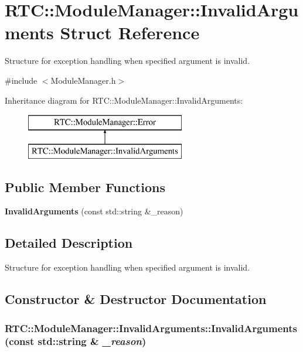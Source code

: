 \section{RTC::ModuleManager::InvalidArguments Struct Reference}
\label{structRTC_1_1ModuleManager_1_1InvalidArguments}


Structure for exception handling when specified argument is invalid.  




{\ttfamily \#include $<$ModuleManager.h$>$}

Inheritance diagram for RTC::ModuleManager::InvalidArguments:\begin{figure}[H]
\begin{center}
\leavevmode
\includegraphics[height=2cm]{structRTC_1_1ModuleManager_1_1InvalidArguments}
\end{center}
\end{figure}
\subsection*{Public Member Functions}
\begin{DoxyCompactItemize}
\item 
{\bf InvalidArguments} (const std::string \&\_\-reason)
\end{DoxyCompactItemize}


\subsection{Detailed Description}
Structure for exception handling when specified argument is invalid. 

\subsection{Constructor \& Destructor Documentation}
\subsubsection[{InvalidArguments}]{\setlength{\rightskip}{0pt plus 5cm}RTC::ModuleManager::InvalidArguments::InvalidArguments (const std::string \& {\em \_\-reason})\hspace{0.3cm}{\ttfamily  [inline]}}\label{structRTC_1_1ModuleManager_1_1InvalidArguments_a4fc5572f3222647ebebc44121c7236ed}
